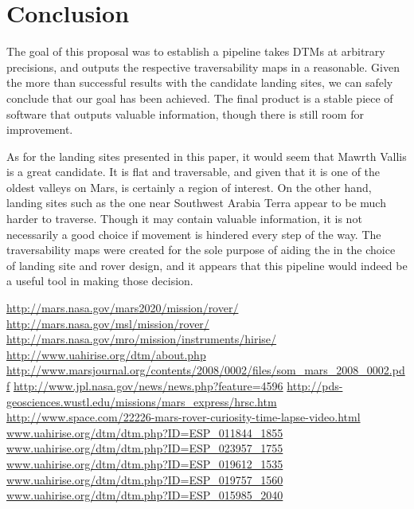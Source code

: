 \documentclass[12pt]{article}
\begin{document}
\section{Conclusion}
\label{sec:conclusion}
\par The goal of this proposal was to establish a pipeline takes DTMs at arbitrary precisions, and outputs the respective traversability maps in a reasonable. Given the more than successful results with the candidate landing sites, we can safely conclude that our goal has been achieved. The final product is a stable piece of software that outputs valuable information, though there is still room for improvement.
\par As for the landing sites presented in this paper, it would seem that Mawrth Vallis is a great candidate. It is flat and traversable, and given that it is one of the oldest valleys on Mars, is certainly a region of interest. On the other hand, landing sites such as the one near Southwest Arabia Terra appear to be much harder to traverse. Though it may contain valuable information, it is not necessarily a good choice if movement is hindered every step of the way. The traversability maps were created for the sole purpose of aiding the in the choice of landing site and rover design, and it appears that this pipeline would indeed be a useful tool in making those decision.

\clearpage
\begin{thebibliography}{30}
  \url{http://mars.nasa.gov/mars2020/mission/rover/}
  \url{http://mars.nasa.gov/msl/mission/rover/}
  \url{http://mars.nasa.gov/mro/mission/instruments/hirise/}
  \url{http://www.uahirise.org/dtm/about.php}
  \url{http://www.marsjournal.org/contents/2008/0002/files/som_mars_2008_0002.pdf}
  \url{http://www.jpl.nasa.gov/news/news.php?feature=4596}
  \url{http://pds-geosciences.wustl.edu/missions/mars_express/hrsc.htm}
  \url{http://www.space.com/22226-mars-rover-curiosity-time-lapse-video.html}
  \url{www.uahirise.org/dtm/dtm.php?ID=ESP_011844_1855}
  \url{www.uahirise.org/dtm/dtm.php?ID=ESP_023957_1755}
  \url{www.uahirise.org/dtm/dtm.php?ID=ESP_019612_1535}
  \url{www.uahirise.org/dtm/dtm.php?ID=ESP_019757_1560}
  \url{www.uahirise.org/dtm/dtm.php?ID=ESP_015985_2040}
\end{thebibliography}
\end{document}
